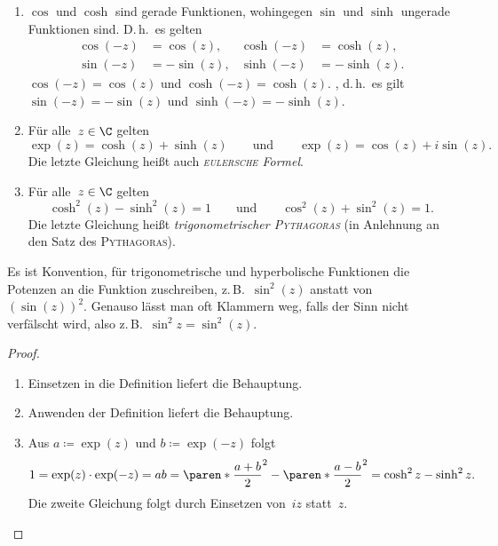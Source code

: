 \documentclass[a4paper]{article}
\begin{document}
\begin{proposition}\label{prop:}\leavevmode
    \begin{enumerate}
        \item $\cos$ und $\cosh$ sind gerade Funktionen, wohingegen $\sin$ und $\sinh$ ungerade Funktionen sind. D.\,h.\ es gelten
              \begin{align*}
                  \cos(-z) & = \cos(z),  & \cosh(-z) & = \cosh(z),  \\
                  \sin(-z) & = -\sin(z), & \sinh(-z) & = -\sinh(z).
              \end{align*}
              $\cos(-z) = \cos(z)$ und $\cosh(-z) = \cosh(z)$. , d.\,h.\ es gilt $\sin(-z) = -\sin(z)$ und $\sinh(-z) = -\sinh(z)$.
        \item Für alle~$z \in \C$ gelten
              \begin{equation*}
                  \exp(z) = \cosh(z)+\sinh(z) \qquad\text{und}\qquad \exp(z) = \cos(z)+i\sin(z).
              \end{equation*}
              Die letzte Gleichung heißt auch \emph{\textsc{eulersche} Formel}.
        \item Für alle~$z \in \C$ gelten
              \begin{equation*}
                  \cosh^2(z) - \sinh^2(z) = 1 \qquad\text{und}\qquad \cos^2(z) + \sin^2(z) = 1.
              \end{equation*}
              Die letzte Gleichung heißt \emph{trigonometrischer \textsc{Pythagoras}} (in Anlehnung an den Satz des \textsc{Pythagoras}).
    \end{enumerate}
\end{proposition}

\begin{notation}
    Es ist Konvention, für trigonometrische und hyperbolische Funktionen die Potenzen an die Funktion zuschreiben, z.\,B.\ $\sin^2(z)$ anstatt von~$(\sin(z))^2$. Genauso lässt man oft Klammern weg, falls der Sinn nicht verfälscht wird, also z.\,B.\ $\sin^2 z = \sin^2(z)$.
\end{notation}

\begin{proof}\leavevmode
    \begin{enumerate}
        \item Einsetzen in die Definition liefert die Behauptung.
        \item Anwenden der Definition liefert die Behauptung.
        \item Aus $a \coloneqq \exp(z)$ und $b \coloneqq \exp(-z)$ folgt
              \begin{equation*}
                  1 = \exp(z)\cdot\exp(-z) = ab = \paren*{\frac{a+b}{2}}^2 - \paren*{\frac{a-b}{2}}^2 = \cosh^2z-\sinh^2z.
              \end{equation*}
              Die zweite Gleichung folgt durch Einsetzen von~$iz$ statt~$z$.\qedhere
    \end{enumerate}
\end{proof}
\end{document}
